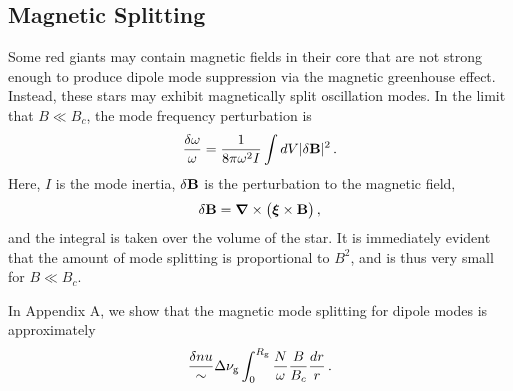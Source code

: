 \subsection{Magnetic Splitting}

Some red giants may contain magnetic fields in their core that are not strong enough to produce dipole mode suppression via the magnetic greenhouse effect. Instead, these stars may exhibit magnetically split oscillation modes. In the limit that $B \ll B_c$, the mode frequency perturbation is \citep{Unno_1989}
\begin{equation}
\label{eqn:dommag}
\frac{\delta \omega}{\omega} = \frac{1}{8 \pi \omega^2 I} \int d V | \delta {\bf B} |^2 \, .
\end{equation}
Here, $I$ is the mode inertia,  $\delta {\bf B}$ is the perturbation to the magnetic field,
\begin{equation}
\label{eqn:dB}
\delta {\bf B} = {\boldsymbol \nabla} \times \big( {\boldsymbol \xi} \times {\bf B} \big) \, ,
\end{equation}
and the integral is taken over the volume of the star. It is immediately evident that the amount of mode splitting is proportional to $B^2$, and is thus very small for $B \ll B_c$.

In Appendix A, we show that the magnetic mode splitting for dipole modes is approximately
\begin{equation}
\label{eqn:dfmag}
\frac{\delta nu} \sim \Delta \nu_{\rm g} \int^{R_{\rm g}}_0 \frac{N}{\omega} \frac{B}{B_c} \frac{dr}{r} \, .
\end{equation}

